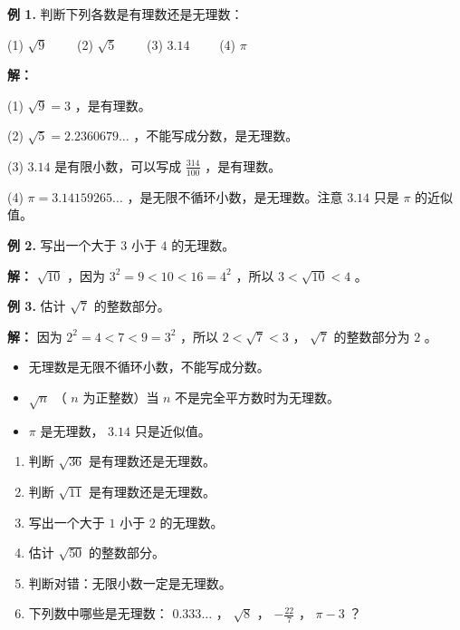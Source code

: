 \begin{workedexamples}


\textbf{例 1.} 判断下列各数是有理数还是无理数：

(1) $\sqrt{9}$ 　　(2) $\sqrt{5}$ 　　(3) $3.14$ 　　(4) $\pi$

\textbf{解：}

(1) $\sqrt{9} = 3$ ，是有理数。

(2) $\sqrt{5} = 2.2360679\ldots$ ，不能写成分数，是无理数。

(3) $3.14$ 是有限小数，可以写成 $\frac{314}{100}$ ，是有理数。

(4) $\pi = 3.14159265\ldots$ ，是无限不循环小数，是无理数。注意 $3.14$ 只是 $\pi$ 的近似值。

\textbf{例 2.} 写出一个大于 $3$ 小于 $4$ 的无理数。

\textbf{解：} $\sqrt{10}$ ，因为 $3^2 = 9 < 10 < 16 = 4^2$ ，所以 $3 < \sqrt{10} < 4$ 。

\textbf{例 3.} 估计 $\sqrt{7}$ 的整数部分。

\textbf{解：} 因为 $2^2 = 4 < 7 < 9 = 3^2$ ，所以 $2 < \sqrt{7} < 3$ ， $\sqrt{7}$ 的整数部分为 $2$ 。

\end{workedexamples}

\begin{keytakeaway}


\begin{itemize}
  \item 无理数是无限不循环小数，不能写成分数。
  \item $\sqrt{n}$ （ $n$ 为正整数）当 $n$ 不是完全平方数时为无理数。
  \item $\pi$ 是无理数， $3.14$ 只是近似值。
\end{itemize}


\end{keytakeaway}

\begin{practice}


\begin{enumerate}
  \item 判断 $\sqrt{36}$ 是有理数还是无理数。
  \item 判断 $\sqrt{11}$ 是有理数还是无理数。
  \item 写出一个大于 $1$ 小于 $2$ 的无理数。
  \item 估计 $\sqrt{50}$ 的整数部分。
  \item 判断对错：无限小数一定是无理数。
  \item 下列数中哪些是无理数： $0.333\ldots$ ， $\sqrt{8}$ ， $-\frac{22}{7}$ ， $\pi - 3$ ？
\end{enumerate}


\end{practice}


